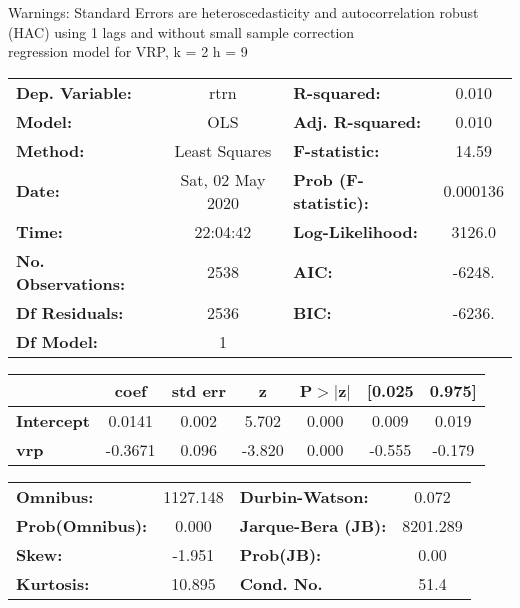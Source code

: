 Warnings: \newline
 [1] Standard Errors are heteroscedasticity and autocorrelation robust (HAC) using 1 lags and without small sample correction\\ 

regression model for VRP, k = 2 h = 9\begin{center}
\begin{tabular}{lclc}
\toprule
\textbf{Dep. Variable:}    &       rtrn       & \textbf{  R-squared:         } &     0.010   \\
\textbf{Model:}            &       OLS        & \textbf{  Adj. R-squared:    } &     0.010   \\
\textbf{Method:}           &  Least Squares   & \textbf{  F-statistic:       } &     14.59   \\
\textbf{Date:}             & Sat, 02 May 2020 & \textbf{  Prob (F-statistic):} &  0.000136   \\
\textbf{Time:}             &     22:04:42     & \textbf{  Log-Likelihood:    } &    3126.0   \\
\textbf{No. Observations:} &        2538      & \textbf{  AIC:               } &    -6248.   \\
\textbf{Df Residuals:}     &        2536      & \textbf{  BIC:               } &    -6236.   \\
\textbf{Df Model:}         &           1      & \textbf{                     } &             \\
\bottomrule
\end{tabular}
\begin{tabular}{lcccccc}
                   & \textbf{coef} & \textbf{std err} & \textbf{z} & \textbf{P$> |$z$|$} & \textbf{[0.025} & \textbf{0.975]}  \\
\midrule
\textbf{Intercept} &       0.0141  &        0.002     &     5.702  &         0.000        &        0.009    &        0.019     \\
\textbf{vrp}       &      -0.3671  &        0.096     &    -3.820  &         0.000        &       -0.555    &       -0.179     \\
\bottomrule
\end{tabular}
\begin{tabular}{lclc}
\textbf{Omnibus:}       & 1127.148 & \textbf{  Durbin-Watson:     } &    0.072  \\
\textbf{Prob(Omnibus):} &   0.000  & \textbf{  Jarque-Bera (JB):  } & 8201.289  \\
\textbf{Skew:}          &  -1.951  & \textbf{  Prob(JB):          } &     0.00  \\
\textbf{Kurtosis:}      &  10.895  & \textbf{  Cond. No.          } &     51.4  \\
\bottomrule
\end{tabular}
\end{center}

